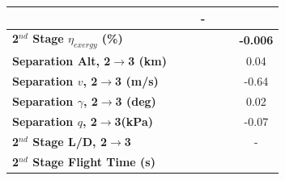 \begin{table}[ht]
\begin{tabular}{l c c c c c c}
		& \firstsecondSeparationgammaCdThreeOneHundredTenNoReturn
		& \firstsecondSeparationgammaCdThreeOneHundredTwentyNoReturn
		& -
		\\
		\hline 
		\textbf{2$^{nd}$ Stage $\eta_{exergy}$ (\%)}
		& \textbf{\secondExergyEffCdThreeEightyNoReturn}
		& \textbf{\secondExergyEffCdThreeNinetyNoReturn}
		& \textbf{\secondExergyEffCdThreeStandardNoReturn}
		& \textbf{\secondExergyEffCdThreeOneHundredTenNoReturn}
		& \textbf{\secondExergyEffCdThreeOneHundredTwentyNoReturn}
		& \textbf{-0.006}
		\\
		\textbf{Separation Alt, 2$\rightarrow$3 (km)}
		& \secondthirdSeparationAltCdThreeEightyNoReturn
		& \secondthirdSeparationAltCdThreeNinetyNoReturn
		& \secondthirdSeparationAltCdThreeStandardNoReturn
		& \secondthirdSeparationAltCdThreeOneHundredTenNoReturn
		& \secondthirdSeparationAltCdThreeOneHundredTwentyNoReturn
		&0.04
		\\
		\textbf{Separation $v$, 2$\rightarrow$3 (m/s)}
		& \secondthirdSeparationvCdThreeEightyNoReturn
		& \secondthirdSeparationvCdThreeNinetyNoReturn
		& \secondthirdSeparationvCdThreeStandardNoReturn
		& \secondthirdSeparationvCdThreeOneHundredTenNoReturn
		& \secondthirdSeparationvCdThreeOneHundredTwentyNoReturn
		&-0.64
		\\
		\textbf{Separation $\gamma$, 2$\rightarrow$3 (deg)}
		& \secondthirdSeparationgammaCdThreeEightyNoReturn
		& \secondthirdSeparationgammaCdThreeNinetyNoReturn
		& \secondthirdSeparationgammaCdThreeStandardNoReturn
		& \secondthirdSeparationgammaCdThreeOneHundredTenNoReturn
		& \secondthirdSeparationgammaCdThreeOneHundredTwentyNoReturn
		&0.02
		\\
		\textbf{Separation $q$, 2$\rightarrow$3(kPa)}
		& \secondthirdSeparationqCdThreeEightyNoReturn
		& \secondthirdSeparationqCdThreeNinetyNoReturn
		& \secondthirdSeparationqCdThreeStandardNoReturn
		& \secondthirdSeparationqCdThreeOneHundredTenNoReturn
		& \secondthirdSeparationqCdThreeOneHundredTwentyNoReturn
		&-0.07
		\\
		\textbf{2$^{nd}$ Stage L/D, 2$\rightarrow$3}
		& \secondthirdSeparationLDCdThreeEightyNoReturn
		& \secondthirdSeparationLDCdThreeNinetyNoReturn
		& \secondthirdSeparationLDCdThreeStandardNoReturn
		& \secondthirdSeparationLDCdThreeOneHundredTenNoReturn
		& \secondthirdSeparationLDCdThreeOneHundredTwentyNoReturn
		& -
		\\
		\textbf{2$^{nd}$ Stage Flight Time (s)}
		& \secondFlightTimeCdThreeEightyNoReturn
		& \secondFlightTimeCdThreeNinetyNoReturn
		& \secondFlightTimeCdThreeStandardNoReturn

\end{tabular}
\end{table}
